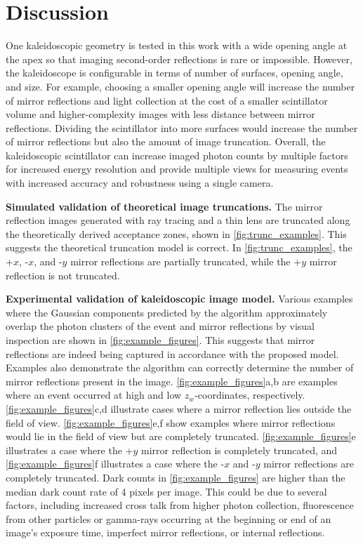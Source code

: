 \section{Discussion}

One kaleidoscopic geometry is tested in this work with a wide opening angle at the 
apex so that imaging second-order reflections is rare or impossible. 
However, the kaleidoscope is configurable in terms of number of surfaces, opening 
angle, and size.
For example, choosing a smaller opening angle will increase the number of mirror 
reflections and light collection at the cost of a smaller scintillator volume and 
higher-complexity images with less distance between mirror reflections.
Dividing the scintillator into more surfaces would increase the number of mirror 
reflections but also the amount of image truncation.
Overall, the kaleidoscopic scintillator can increase imaged photon counts by 
multiple factors for increased energy resolution and provide multiple views for 
measuring events with increased accuracy and robustness using a single camera.

\noindent
\textbf{Simulated validation of theoretical image truncations.}
The mirror reflection images generated with ray tracing and a thin lens are 
truncated along the theoretically derived acceptance zones, shown in \cref{fig:trunc_examples}. 
This suggests the theoretical truncation model is correct.
In \cref{fig:trunc_examples}, the +$x$, -$x$, and -$y$ mirror reflections are 
partially truncated, while the +$y$ mirror reflection is not truncated.

\noindent
\textbf{Experimental validation of kaleidoscopic image model.}
Various examples where the Gaussian components predicted by the 
algorithm approximately overlap the photon clusters of the event and mirror 
reflections by visual inspection are shown in \cref{fig:example_figures}.
This suggests that mirror reflections are indeed being captured in accordance with 
the proposed model.
Examples also demonstrate the algorithm can correctly determine the number of 
mirror reflections present in the image.
\cref{fig:example_figures}a,b are examples where an event occurred at high and 
low $z_w$-coordinates, respectively.
\cref{fig:example_figures}c,d illustrate cases where a mirror reflection lies 
outside the field of view. 
\cref{fig:example_figures}e,f show examples where mirror reflections would lie in 
the field of view but are completely truncated.
\cref{fig:example_figures}e illustrates a case where the +$y$ mirror reflection is 
completely truncated, and \cref{fig:example_figures}f illustrates a case where the 
-$x$ and -$y$ mirror reflections are completely truncated.
Dark counts in \cref{fig:example_figures} are higher than the median dark count 
rate of 4 pixels per image.
This could be due to several factors, including increased cross talk from higher 
photon collection, fluorescence from other particles or gamma-rays occurring at 
the beginning or end of an image's exposure time, imperfect mirror reflections, 
or internal reflections.

